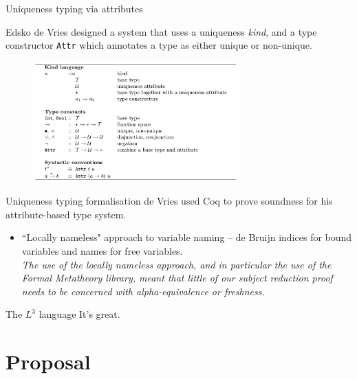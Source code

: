\documentclass[10pt]{beamer}
\begin{document}
\begin{frame}{Uniqueness typing via attributes}

Edsko de Vries designed a system that uses a uniqueness \textit{kind}, and a type constructor \texttt{Attr} which annotates a type as either unique or non-unique.

\begin{figure}[h]
\centering
\includegraphics[width=300px]{de_Vries_attributes.png}
\label{}
\end{figure}
\end{frame}

\begin{frame}{Uniqueness typing formalisation}
de Vries used Coq to prove soundness for his attribute-based type system.

\begin{itemize}
\item ``Locally nameless" approach to variable naming -- de Bruijn indices for bound variables and names for free variables.\\

\textit{The use of the locally nameless approach, and in particular the use of the Formal Metatheory library, meant that little of our subject reduction
proof needs to be concerned with alpha-equivalence or freshness.}

\end{itemize}
\end{frame}

\begin{frame}{The \textbf{$L^3$} language}
It's great.
\end{frame}

\section{Proposal}
\end{document}
